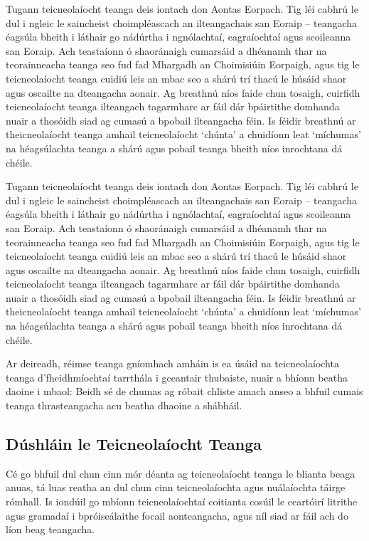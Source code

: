 \begin{multicols}{2}
Tugann teicneolaíocht teanga deis iontach don Aontas Eorpach. Tig léi cabhrú le dul i ngleic le saincheist choimpléascach an ilteangachais san Eoraip – teangacha éagsúla bheith i láthair go nádúrtha i ngnólachtaí, eagraíochtaí agus scoileanna san Eoraip. Ach teastaíonn ó shaoránaigh cumarsáid a dhéanamh thar na teorainneacha teanga seo fud fad Mhargadh an Choimisiúin Eorpaigh, agus tig le teicneolaíocht teanga cuidiú leis an mbac seo a shárú trí thacú le húsáid shaor agus oscailte na dteangacha aonair. Ag breathnú níos faide chun tosaigh, cuirfidh teicneolaíocht teanga ilteangach tagarmharc ar fáil dár bpáirtithe domhanda nuair a thosóidh siad ag cumasú a bpobail ilteangacha féin. Is féidir breathnú ar theicneolaíocht teanga amhail teicneolaíocht ‘chúnta’ a chuidíonn leat `míchumas’ na héagsúlachta teanga a shárú agus pobail teanga bheith níos inrochtana dá chéile.


Tugann teicneolaíocht teanga deis iontach don Aontas Eorpach. Tig léi cabhrú le dul i ngleic le saincheist choimpléascach an ilteangachais san Eoraip – teangacha éagsúla bheith i láthair go nádúrtha i ngnólachtaí, eagraíochtaí agus scoileanna san Eoraip. Ach teastaíonn ó shaoránaigh cumarsáid a dhéanamh thar na teorainneacha teanga seo fud fad Mhargadh an Choimisiúin Eorpaigh, agus tig le teicneolaíocht teanga cuidiú leis an mbac seo a shárú trí thacú le húsáid shaor agus oscailte na dteangacha aonair. Ag breathnú níos faide chun tosaigh, cuirfidh teicneolaíocht teanga ilteangach tagarmharc ar fáil dár bpáirtithe domhanda nuair a thosóidh siad ag cumasú a bpobail ilteangacha féin. Is féidir breathnú ar theicneolaíocht teanga amhail teicneolaíocht ‘chúnta’ a chuidíonn leat ‘míchumas’ na héagsúlachta teanga a shárú agus pobail teanga bheith níos inrochtana dá chéile.

Ar deireadh, réimse teanga gníomhach amháin is ea úsáid na teicneolaíochta teanga d’fheidhmíochtaí tarrthála i gceantair thubaiste, nuair a bhíonn beatha daoine i mbaol: Beidh sé de chumas ag róbait chliste amach anseo a bhfuil cumais teanga thrasteangacha acu beatha dhaoine a shábháil.

\subsection{Dúshláin le Teicneolaíocht Teanga}

Cé go bhfuil dul chun cinn mór déanta ag teicneolaíocht teanga le blianta beaga anuas, tá luas reatha an dul chun cinn teicneolaíochta agus nuálaíochta táirge rómhall. Is iondúil go mbíonn teicneolaíochtaí coitianta cosúil le ceartóirí litrithe agus gramadaí i bpróiseálaithe focail aonteangacha, agus níl siad ar fáil ach do líon beag teangacha. 


\end{multicols}
